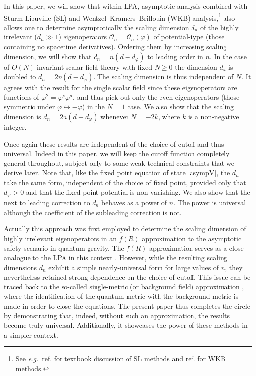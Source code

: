 \documentclass[11pt,a4paper]{article}
\numberwithin{figure}{section}
\numberwithin{equation}{section}
\newcommand\eg{\textit{e.g.}\ }
\newcommand{\ph}{\varphi}
\newcommand{\cO}{\mathcal{O}}
\begin{document}
In this paper, we will show that within LPA, asymptotic analysis combined with Sturm-Liouville (SL) and Wentzel–Kramers–Brillouin (WKB) analysis,\footnote{See \eg ref. \cite{Ince1956} for textbook discussion of SL methods and ref. \cite{morse1953methods} for WKB methods.} also allows one to determine asymptotically the scaling dimension $d_n$ of the highly irrelevant ($d_n\gg1$) eigenoperators $\cO_n=\cO_n(\ph)$ of potential-type (those containing no spacetime derivatives). Ordering them by increasing scaling dimension, we will show that $d_n = n(d-d_\ph)$ to leading order in $n$. In the case of $O(N)$ invariant scalar field theory with fixed $N\ge0$ the dimension $d_n$ is doubled to $d_n = 2n(d-d_\ph)$. The scaling dimension is thus independent of $N$. It agrees with the result for the single scalar field since these eigenoperators are functions of $\ph^2=\ph^a\ph^a$, and thus pick out only the even eigenoperators (those symmetric under $\ph\leftrightarrow-\ph$) in the $N=1$ case. We also show that the scaling dimension is $d_n = 2n(d-d_\ph)$ whenever $N=-2k$, where $k$ is a non-negative integer. 


Once again these results are independent of the choice of cutoff and thus universal. Indeed in this paper, we will keep the cutoff function completely general throughout, subject only to some weak technical constraints that we derive later. Note that, like the fixed point equation of state \eqref{asympV}, the $d_n$ take the same form, independent of the choice of fixed point, provided only that $d_\ph>0$ and that the fixed point potential is non-vanishing. 
We also show that the next to leading correction to $d_n$ behaves as a power of $n$. The power is universal although the coefficient of the subleading correction is not.


Actually this approach was first employed to determine the scaling dimension of highly irrelevant eigenoperators in an $f(R)$ approximation \cite{Mitchell:2021qjr,Morris:2022btf} to the asymptotic safety scenario \cite{Reuter:1996,Percacci:2017fkn,Reuter:2019byg} in quantum gravity. 
The $f(R)$ approximation serves as a close analogue to the LPA in this context \cite{Benedetti:2012,Dietz:2012ic,Benedetti:2013jk}.  However, while the resulting scaling dimensions $d_n$ exhibit a simple nearly-universal form for large values of $n$, they nevertheless retained strong dependence on the choice of cutoff. This issue can be traced back \cite{Morris:2022btf} to the so-called single-metric (or background field) approximation \cite{Reuter:1996}, where  the identification of the quantum metric with the background metric is made in order to close the equations. The present paper thus completes the circle by demonstrating that, indeed, without such an approximation, the results become truly universal. Additionally, it showcases the power of these methods in a simpler context.
\end{document}
